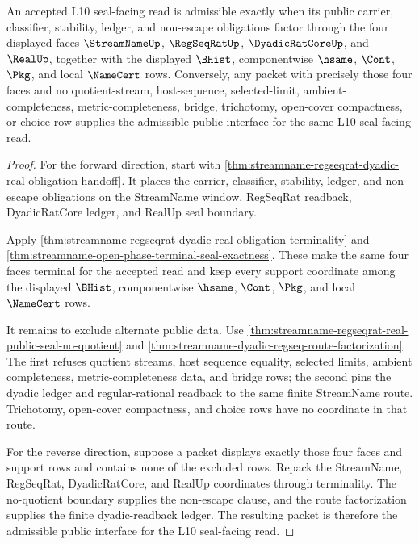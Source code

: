 \begin{theorem}
\label{thm:streamname-regseqrat-dyadic-real-four-face-exactness}
An accepted L10 seal-facing read is admissible exactly when its public carrier, classifier, stability, ledger, and non-escape obligations factor through the four displayed faces $\StreamNameUp$, $\RegSeqRatUp$, $\DyadicRatCoreUp$, and $\RealUp$, together with the displayed $\BHist$, componentwise $\hsame$, $\Cont$, $\Pkg$, and local $\NameCert$ rows. Conversely, any packet with precisely those four faces and no quotient-stream, host-sequence, selected-limit, ambient-completeness, metric-completeness, bridge, trichotomy, open-cover compactness, or choice row supplies the admissible public interface for the same L10 seal-facing read.
\end{theorem}
\begin{proof}
For the forward direction, start with \autoref{thm:streamname-regseqrat-dyadic-real-obligation-handoff}. It places the carrier, classifier, stability, ledger, and non-escape obligations on the StreamName window, RegSeqRat readback, DyadicRatCore ledger, and RealUp seal boundary.

Apply \autoref{thm:streamname-regseqrat-dyadic-real-obligation-terminality} and \autoref{thm:streamname-open-phase-terminal-seal-exactness}. These make the same four faces terminal for the accepted read and keep every support coordinate among the displayed $\BHist$, componentwise $\hsame$, $\Cont$, $\Pkg$, and local $\NameCert$ rows.

It remains to exclude alternate public data. Use \autoref{thm:streamname-regseqrat-real-public-seal-no-quotient} and \autoref{thm:streamname-dyadic-regseq-route-factorization}. The first refuses quotient streams, host sequence equality, selected limits, ambient completeness, metric-completeness data, and bridge rows; the second pins the dyadic ledger and regular-rational readback to the same finite StreamName route. Trichotomy, open-cover compactness, and choice rows have no coordinate in that route.

For the reverse direction, suppose a packet displays exactly those four faces and support rows and contains none of the excluded rows. Repack the StreamName, RegSeqRat, DyadicRatCore, and RealUp coordinates through terminality. The no-quotient boundary supplies the non-escape clause, and the route factorization supplies the finite dyadic-readback ledger. The resulting packet is therefore the admissible public interface for the L10 seal-facing read.
\end{proof}

